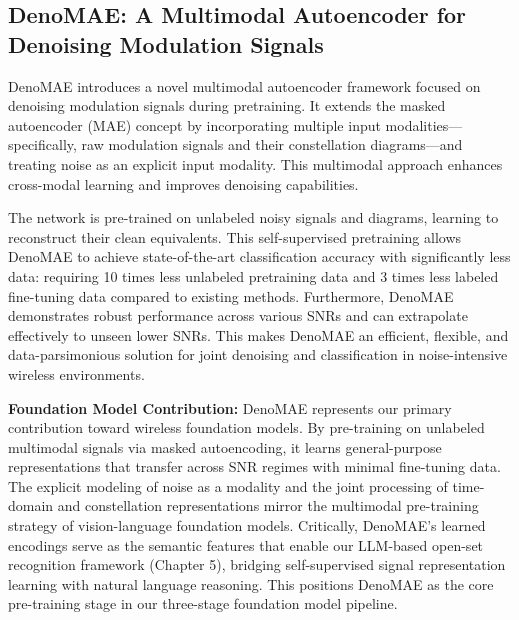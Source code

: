 \subsection{DenoMAE: A Multimodal Autoencoder for Denoising Modulation Signals}\label{sec:denomae}

DenoMAE introduces a novel multimodal autoencoder framework focused on denoising modulation signals during pretraining. It extends the masked autoencoder (MAE) concept by incorporating multiple input modalities—specifically, raw modulation signals and their constellation diagrams—and treating noise as an explicit input modality. This multimodal approach enhances cross-modal learning and improves denoising capabilities.

The network is pre-trained on unlabeled noisy signals and diagrams, learning to reconstruct their clean equivalents. This self-supervised pretraining allows DenoMAE to achieve state-of-the-art classification accuracy with significantly less data: requiring 10 times less unlabeled pretraining data and 3 times less labeled fine-tuning data compared to existing methods. Furthermore, DenoMAE demonstrates robust performance across various SNRs and can extrapolate effectively to unseen lower SNRs. This makes DenoMAE an efficient, flexible, and data-parsimonious solution for joint denoising and classification in noise-intensive wireless environments.

\textbf{Foundation Model Contribution:} DenoMAE represents our primary contribution toward wireless foundation models. By pre-training on unlabeled multimodal signals via masked autoencoding, it learns general-purpose representations that transfer across SNR regimes with minimal fine-tuning data. The explicit modeling of noise as a modality and the joint processing of time-domain and constellation representations mirror the multimodal pre-training strategy of vision-language foundation models. Critically, DenoMAE's learned encodings serve as the semantic features that enable our LLM-based open-set recognition framework (Chapter 5), bridging self-supervised signal representation learning with natural language reasoning. This positions DenoMAE as the core pre-training stage in our three-stage foundation model pipeline.


